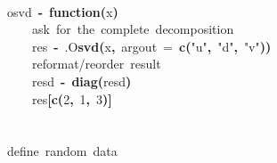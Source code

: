 \documentclass[english,10pt,a4paper]{article}\usepackage{graphicx, color}
\makeatletter
\newcommand{\hlnumber}[1]{\textcolor[rgb]{0,0,0}{#1}}%
\newcommand{\hlfunctioncall}[1]{\textcolor[rgb]{0.501960784313725,0,0.329411764705882}{\textbf{#1}}}%
\newcommand{\hlstring}[1]{\textcolor[rgb]{0.6,0.6,1}{#1}}%
\newcommand{\hlkeyword}[1]{\textcolor[rgb]{0,0,0}{\textbf{#1}}}%
\newcommand{\hlargument}[1]{\textcolor[rgb]{0.690196078431373,0.250980392156863,0.0196078431372549}{#1}}%
\newcommand{\hlcomment}[1]{\textcolor[rgb]{0.180392156862745,0.6,0.341176470588235}{#1}}%
\newcommand{\hlformalargs}[1]{\textcolor[rgb]{0.690196078431373,0.250980392156863,0.0196078431372549}{#1}}%
\newcommand{\hlassignement}[1]{\textcolor[rgb]{0,0,0}{\textbf{#1}}}%
\newcommand{\hlsymbol}[1]{\textcolor[rgb]{0,0,0}{#1}}%
\newcommand{\hlstd}[1]{\textcolor[rgb]{0,0,0}{#1}}%
\newenvironment{kframe}{%
 \def\FrameCommand##1{\hskip\@totalleftmargin \hskip-\fboxsep
 \colorbox{shadecolor}{##1}\hskip-\fboxsep
     \hskip-\linewidth \hskip-\@totalleftmargin \hskip\columnwidth}%
 \MakeFramed {\advance\hsize-\width
   \@totalleftmargin\z@ \linewidth\hsize
   \@setminipage}}%
 {\par\unskip\endMakeFramed}
\newenvironment{knitrout}{}{} %
\makeatother
\begin{document}
\begin{knitrout}
\color{fgcolor}\begin{kframe}
\begin{flushleft}
\ttfamily\noindent
\hspace*{\fill}\\
\hlstd{}\hlsymbol{o\usebox{\hlnormalsizeboxunderscore}svd}{\ }\hlassignement{\usebox{\hlnormalsizeboxlessthan}-}{\ }\hlkeyword{function}\hlkeyword{(}\hlformalargs{x}\hlkeyword{)}{\ }\hlkeyword{\usebox{\hlnormalsizeboxopenbrace}}\hspace*{\fill}\\
\hlstd{}{\ }{\ }{\ }{\ }\hlcomment{\usebox{\hlnormalsizeboxhash}{\ }ask{\ }for{\ }the{\ }complete{\ }decomposition}\hspace*{\fill}\\
\hlstd{}{\ }{\ }{\ }{\ }\hlsymbol{res}{\ }\hlassignement{\usebox{\hlnormalsizeboxlessthan}-}{\ }\hlsymbol{.O}\hlkeyword{\usebox{\hlnormalsizeboxdollar}}\hlfunctioncall{svd}\hlkeyword{(}\hlsymbol{x}\hlkeyword{,}{\ }\hlargument{argout}{\ }\hlargument{=}{\ }\hlfunctioncall{c}\hlkeyword{(}\hlstring{"{}u"{}}\hlkeyword{,}{\ }\hlstring{"{}d"{}}\hlkeyword{,}{\ }\hlstring{"{}v"{}}\hlkeyword{)}\hlkeyword{)}\hspace*{\fill}\\
\hlstd{}{\ }{\ }{\ }{\ }\hlcomment{\usebox{\hlnormalsizeboxhash}{\ }reformat/reorder{\ }result}\hspace*{\fill}\\
\hlstd{}{\ }{\ }{\ }{\ }\hlsymbol{res}\hlkeyword{\usebox{\hlnormalsizeboxdollar}}\hlsymbol{d}{\ }\hlassignement{\usebox{\hlnormalsizeboxlessthan}-}{\ }\hlfunctioncall{diag}\hlkeyword{(}\hlsymbol{res}\hlkeyword{\usebox{\hlnormalsizeboxdollar}}\hlsymbol{d}\hlkeyword{)}\hspace*{\fill}\\
\hlstd{}{\ }{\ }{\ }{\ }\hlsymbol{res}\hlkeyword{[}\hlfunctioncall{c}\hlkeyword{(}\hlnumber{2}\hlkeyword{,}{\ }\hlnumber{1}\hlkeyword{,}{\ }\hlnumber{3}\hlkeyword{)}\hlkeyword{]}\hspace*{\fill}\\
\hlstd{}\hlkeyword{\usebox{\hlnormalsizeboxclosebrace}}\hspace*{\fill}\\
\hlstd{}\hspace*{\fill}\\
\hlstd{}\hlcomment{\usebox{\hlnormalsizeboxhash}{\ }define{\ }random{\ }data}\hspace*{\fill}\\

\end{flushleft}
\end{kframe}
\end{knitrout}
\end{document}
